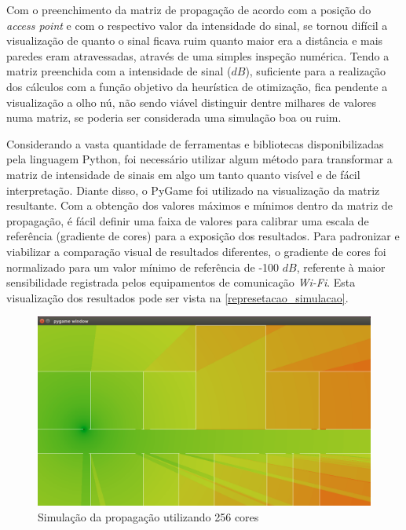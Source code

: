 \documentclass[
	12pt,				%
	twoside,			%
	a4paper,			%
	english,			%
	french,				%
	spanish,			%
	brazil				%
	]{abntex2}
\begin{document}
Com o preenchimento da matriz de propagação de acordo com a posição do
\emph{access point} e com o respectivo valor da intensidade do sinal, se
tornou difícil a visualização de quanto o sinal ficava ruim quanto maior
era a distância e mais paredes eram atravessadas, através de uma simples
inspeção numérica. Tendo a matriz preenchida com a intensidade de sinal
(\(dB\)), suficiente para a realização dos cálculos com a função
objetivo da heurística de otimização, fica pendente a visualização a
olho nú, não sendo viável distinguir dentre milhares de valores numa
matriz, se poderia ser considerada uma simulação boa ou ruim.

Considerando a vasta quantidade de ferramentas e bibliotecas
disponibilizadas pela linguagem Python, foi necessário utilizar algum
método para transformar a matriz de intensidade de sinais em algo um
tanto quanto visível e de fácil interpretação. Diante disso, o PyGame
foi utilizado na visualização da matriz resultante. Com a obtenção dos
valores máximos e mínimos dentro da matriz de propagação, é fácil
definir uma faixa de valores para calibrar uma escala de referência
(gradiente de cores) para a exposição dos resultados. Para padronizar e
viabilizar a comparação visual de resultados diferentes, o gradiente de
cores foi normalizado para um valor mínimo de referência de -100 \(dB\),
referente à maior sensibilidade registrada pelos equipamentos de
comunicação \emph{Wi-Fi}. Esta visualização dos resultados pode ser
vista na \autoref{represetacao_simulacao}.

\begin{figure}[ht]
    \caption{\label{represetacao_simulacao} Simulação da propagação utilizando 256 cores}
    \begin{center}
        \includegraphics[scale=0.4]{imagens/representacao-simulacao.jpg}
    \end{center}
\end{figure}
\end{document}
